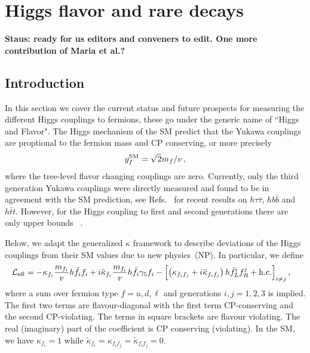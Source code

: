 \documentclass[../report.tex]{subfiles}
\begin{document}
\section{Higgs flavor and rare decays}


{\bf{Staus: ready for us editors and conveners to edit. One more contribution of Maria et al.?}}

\subsection{Introduction}

In this section we cover the current status and future prospects for measuring the different Higgs couplings to fermions, these go under the generic name of ``Higgs and Flavor". 
The Higgs mechanism of the SM predict that the Yukawa couplings are proptional to the fermion mass and CP conserving, or more precisely 
%
\begin{align}
    y^{\rm SM}_f = \sqrt{2} m_f / v \, ,
\end{align}
%
where the tree-level flavor changing couplings are zero. 
Currently, only the third generation Yukawa couplings were directly measured and found to be in agreement with the SM prediction, see Refs.~\cite{} for recent results on $h\tau\bar{\tau}$, $h b\bar{b}$ and $h \bar{t} t$. 
However, for the Higgs coupling to first and second generations there are only upper bounds ~\cite{}.

Below, we adapt the generalized $\kappa$ framework to describe deviations of the Higgs couplings from their SM values due to new physics~(NP).
In particular, we define 
%
\begin{equation}
\label{eq:L_eff}
\begin{split}
	\mathcal{L}_{\rm eff} &= -\kappa_{f_i} \frac{m_{f_i}}{v} h \bar f_i f_i + i \tilde \kappa_{f_i} \frac{m_{f_i}}{v} h \bar f_i \gamma_5 f_i  
	- \left[\left( \kappa_{f_i f_j} + i \tilde \kappa_{f_i f_j} \right) h \bar f_L^i f_R^j +{\rm h.c.}\right]_{i\neq j}, 
\end{split}
\end{equation}
%
where a sum over fermion type $f=u,d,\ell$ and generations $i,j=1,2,3$ is implied.
The first two terms are flavour-diagonal with the first term CP-conserving and
the second CP-violating.  The terms in square brackets are flavour
violating. The real (imaginary) part of the coefficient is CP
conserving (violating). In the SM, we have $\kappa_{f_i}=1$ while $\tilde
\kappa_{f_i}=\kappa_{{f_i}{f_j}}=\tilde \kappa_{{f_i}{f_j}}=0$.
\end{document}
